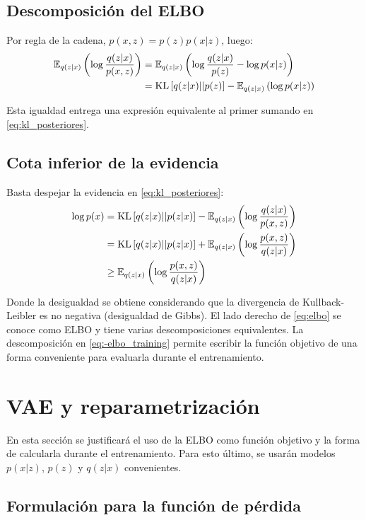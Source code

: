 \documentclass{article}
\begin{document}
\subsection{Descomposición del ELBO}

Por regla de la cadena, $p(x,z)=p(z)p(x|z)$, luego:
\begin{align}{}
	\mathbb{E}_{q(z|x)}\left(\log\frac{q(z|x)}{p(x,z)}\right) &= \mathbb{E}_{q(z|x)}\left(\log\frac{q(z|x)}{p(z)} - \log p(x|z)\right)\\
	&= \text{KL}\left[q(z|x)||p(z)\right] - \mathbb{E}_{q(z|x)}\left(\log p(x|z)\right) \label{eq:-elbo_training}
\end{align}

Esta igualdad entrega una expresión equivalente al primer sumando en \eqref{eq:kl_posteriores}.

\subsection{Cota inferior de la evidencia}

Basta despejar la evidencia en \eqref{eq:kl_posteriores}:
\begin{align}
	\log p(x) &= \text{KL}\left[q(z|x)||p(z|x)\right] - \mathbb{E}_{q(z|x)}\left(\log\frac{q(z|x)}{p(x,z)}\right)\\
		&= \text{KL}\left[q(z|x)||p(z|x)\right] + \mathbb{E}_{q(z|x)}\left(\log\frac{p(x,z)}{q(z|x)}\right) \label{eq:evidencia}\\
		&\geq \mathbb{E}_{q(z|x)}\left(\log\frac{p(x,z)}{q(z|x)}\right) \label{eq:elbo}
\end{align}

Donde la desigualdad se obtiene considerando que la divergencia de Kullback-Leibler es no negativa (desigualdad de Gibbs). El lado derecho de \eqref{eq:elbo} se conoce como ELBO y tiene varias descomposiciones equivalentes. La descomposición en \eqref{eq:-elbo_training} permite escribir la función objetivo de una forma conveniente para evaluarla durante el entrenamiento.

\section{VAE y reparametrización}

En esta sección se justificará el uso de la ELBO como función objetivo y la forma de calcularla durante el entrenamiento. Para esto último, se usarán modelos $p(x|z)$, $p(z)$ y $q(z|x)$ convenientes.

\subsection{Formulación para la función de pérdida}
\end{document}
